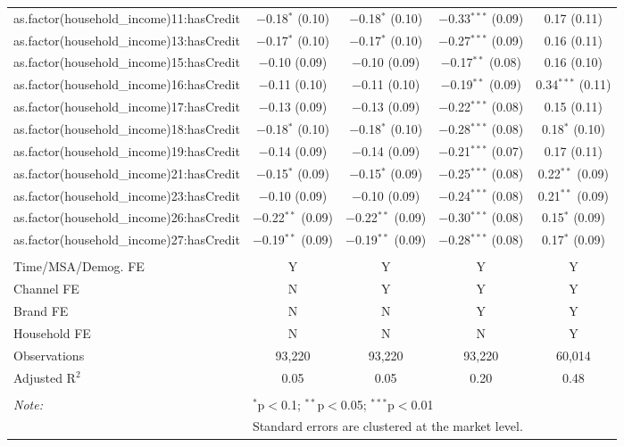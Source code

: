\begin{table}[!htbp]
\begin{tabular}{@{\extracolsep{5pt}}lcccc}
  as.factor(household\_income)11:hasCredit & $-$0.18$^{*}$ (0.10) & $-$0.18$^{*}$ (0.10) & $-$0.33$^{***}$ (0.09) & 0.17 (0.11) \\ 
  as.factor(household\_income)13:hasCredit & $-$0.17$^{*}$ (0.10) & $-$0.17$^{*}$ (0.10) & $-$0.27$^{***}$ (0.09) & 0.16 (0.11) \\ 
  as.factor(household\_income)15:hasCredit & $-$0.10 (0.09) & $-$0.10 (0.09) & $-$0.17$^{**}$ (0.08) & 0.16 (0.10) \\ 
  as.factor(household\_income)16:hasCredit & $-$0.11 (0.10) & $-$0.11 (0.10) & $-$0.19$^{**}$ (0.09) & 0.34$^{***}$ (0.11) \\ 
  as.factor(household\_income)17:hasCredit & $-$0.13 (0.09) & $-$0.13 (0.09) & $-$0.22$^{***}$ (0.08) & 0.15 (0.11) \\ 
  as.factor(household\_income)18:hasCredit & $-$0.18$^{*}$ (0.10) & $-$0.18$^{*}$ (0.10) & $-$0.28$^{***}$ (0.08) & 0.18$^{*}$ (0.10) \\ 
  as.factor(household\_income)19:hasCredit & $-$0.14 (0.09) & $-$0.14 (0.09) & $-$0.21$^{***}$ (0.07) & 0.17 (0.11) \\ 
  as.factor(household\_income)21:hasCredit & $-$0.15$^{*}$ (0.09) & $-$0.15$^{*}$ (0.09) & $-$0.25$^{***}$ (0.08) & 0.22$^{**}$ (0.09) \\ 
  as.factor(household\_income)23:hasCredit & $-$0.10 (0.09) & $-$0.10 (0.09) & $-$0.24$^{***}$ (0.08) & 0.21$^{**}$ (0.09) \\ 
  as.factor(household\_income)26:hasCredit & $-$0.22$^{**}$ (0.09) & $-$0.22$^{**}$ (0.09) & $-$0.30$^{***}$ (0.08) & 0.15$^{*}$ (0.09) \\ 
  as.factor(household\_income)27:hasCredit & $-$0.19$^{**}$ (0.09) & $-$0.19$^{**}$ (0.09) & $-$0.28$^{***}$ (0.08) & 0.17$^{*}$ (0.09) \\ 
 \hline \\[-1.8ex] 
Time/MSA/Demog. FE & Y & Y & Y & Y \\ 
Channel FE & N & Y & Y & Y \\ 
Brand FE & N & N & Y & Y \\ 
Household FE & N & N & N & Y \\ 
Observations & 93,220 & 93,220 & 93,220 & 60,014 \\ 
Adjusted R$^{2}$ & 0.05 & 0.05 & 0.20 & 0.48 \\ 
\hline 
\hline \\[-1.8ex] 
\textit{Note:}  & \multicolumn{4}{l}{$^{*}$p$<$0.1; $^{**}$p$<$0.05; $^{***}$p$<$0.01} \\ 
 & \multicolumn{4}{l}{Standard errors are clustered at the market level.} \\ 
\end{tabular} 
\end{table} 
